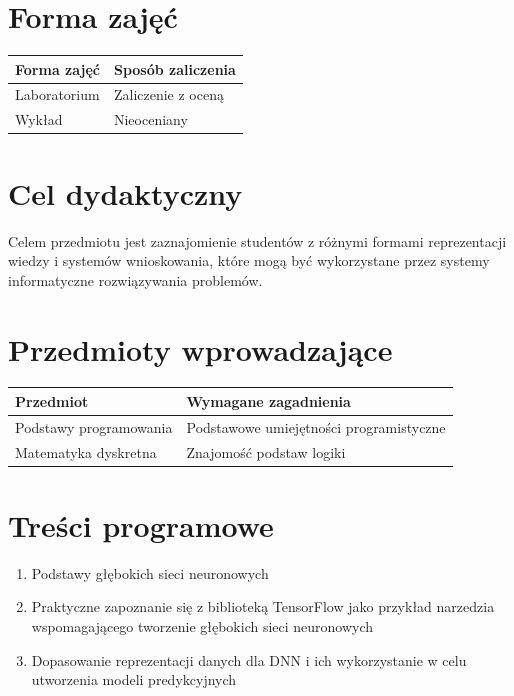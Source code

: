 \documentclass[12pt, a4paper]{article}
\begin{document}
\section{Forma zajęć}

\begin{tabular}{ll}
  \hline
  \textbf{Forma zajęć} & \textbf{Sposób zaliczenia} \\
  \hline
  Laboratorium & Zaliczenie z oceną \\
  Wykład & Nieoceniany \\
  \hline
\end{tabular}

\section{Cel dydaktyczny}

Celem przedmiotu jest zaznajomienie studentów z różnymi formami reprezentacji wiedzy i systemów wnioskowania, które mogą być wykorzystane przez systemy informatyczne rozwiązywania problemów.

\section{Przedmioty wprowadzające}

\begin{tabularx}{\textwidth}{lX}
  \hline
  \textbf{Przedmiot} & \textbf{Wymagane zagadnienia} \\
  \hline
  Podstawy programowania & Podstawowe umiejętności programistyczne \\
  Matematyka dyskretna & Znajomość podstaw logiki \\
  \hline
\end{tabularx}

\section{Treści programowe}

\begin{enumerate}
  \item Podstawy głębokich sieci neuronowych
  \item Praktyczne zapoznanie się z biblioteką TensorFlow jako przykład narzedzia wspomagającego tworzenie głębokich sieci neuronowych
  \item Dopasowanie reprezentacji danych dla DNN i ich wykorzystanie w celu utworzenia modeli predykcyjnych
\end{enumerate}
\end{document}
